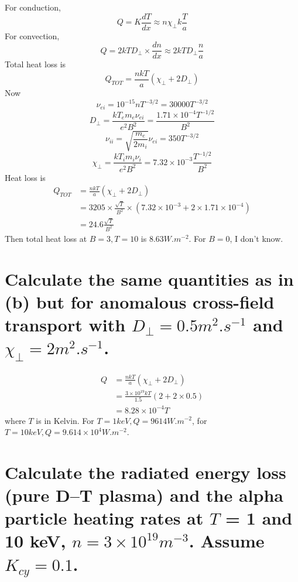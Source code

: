 \documentclass[answers]{exam}
\begin{document}
\begin{questions}
\begin{parts}
\begin{solution}
    For conduction,
    $$Q = K \frac{dT}{dx} \approx n\chi_\perp k \frac{T}{a}$$
    For convection,
    $$Q = 2kT D_\perp \times \frac{dn}{dx} \approx 2kTD_\perp\frac{n}{a}$$
    Total heat loss is
    $$Q_{TOT} = \frac{nkT}{a} (\chi_\perp + 2D_\perp)$$
    Now
    $$\nu_{ei} = 10^{-15}nT^{-3/2} = 30000T^{-3/2}$$
    $$D_\perp = \frac{kT_em_e\nu_{ei}}{e^2B^2} = \frac{1.71 \times 10^{-4}T^{-1/2}}{B^2}$$ %
    $$\nu_{ii} = \sqrt{\frac{m_e}{2m_i}}\nu_{ei} = 350T^{-3/2}$$ %
    $$\chi_\perp = \frac{kT_im_i\nu_i}{e^2B^2} = 7.32 \times 10^{-3} \frac{T^{-1/2}}{B^2}$$ %
    Heat loss is
    \begin{align*}
        Q_{TOT} &= \frac{nkT}{a} (\chi_\perp + 2D_\perp) \\
                &= 3205 \times \frac{\sqrt{T}}{B^2} \times \left(7.32 \times 10^{-3} + 2 \times 1.71 \times 10^{-4}\right) \\ %
                &= 24.6 \frac{\sqrt{T}}{B^2} %
    \end{align*}
    Then total heat loss at $B = 3, T = 10$ is $8.63\unit{W.m^{-2}}$. For $B = 0$, I don't know.
\end{solution}

\part{Calculate the same quantities as in (b) but for anomalous cross-field transport with $D_\perp = 0.5 \unit{m^2.s^{-1}}$ and $\chi_\perp = 2 \unit{m^2.s^{-1}}$.}

\begin{solution}
    \begin{align*}
        Q &= \frac{nkT}{a}(\chi_\perp + 2D_\perp) \\
          &= \frac{3\times10^{19}kT}{1.5} (2 + 2 \times 0.5) \\
          &= 8.28 \times 10^{-4}T
    \end{align*}
    where $T$ is in Kelvin. For $T = 1\unit{keV}, Q = 9614\unit{W.m^{-2}}$, for $T = 10\unit{keV}, Q = 9.614 \times 10^4 \unit{W.m^{-2}}$.
\end{solution}

\part{Calculate the radiated energy loss (pure D–T plasma) and the alpha particle heating rates at $T$ = 1 and 10 keV, $n = 3 \times 10^{19} \unit{m^{-3}}$. Assume $K_{cy} = 0.1$.}


\end{parts}
\end{questions}
\end{document}
